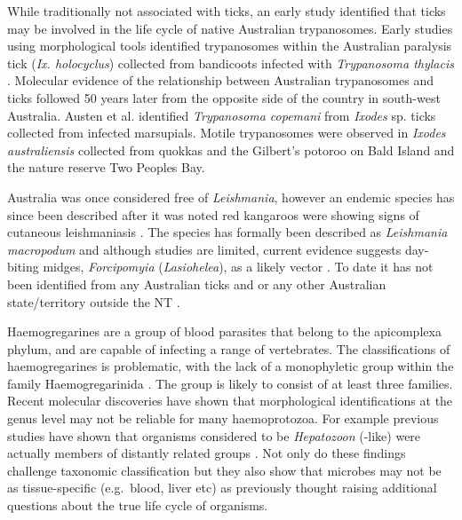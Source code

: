 \documentclass[a4paper, nobind]{templates/ociamthesis}
\begin{document}
While traditionally not associated with ticks, an early study identified that ticks may be involved in the life cycle of native Australian trypanosomes.
Early studies using morphological tools identified trypanosomes within the Australian paralysis tick (\emph{Ix. holocyclus}) collected from bandicoots infected with \emph{Trypanosoma thylacis} \autocite{mackerrasHaematozoaAustralianMammals1959}.
Molecular evidence of the relationship between Australian trypanosomes and ticks followed 50 years later from the opposite side of the country in south-west Australia.
Austen et al. \autocite*{austenVectorTrypanosomaCopemani2011} identified \emph{Trypanosoma copemani} from \emph{Ixodes} sp. ticks collected from infected marsupials.
Motile trypanosomes were observed in \emph{Ixodes australiensis} collected from quokkas and the Gilbert's potoroo on Bald Island and the nature reserve Two Peoples Bay.

Australia was once considered free of \emph{Leishmania}, however an endemic species has since been described after it was noted red kangaroos were showing signs of cutaneous leishmaniasis \autocite{roseCutaneousLeishmaniasisRed2004}.
The species has formally been described as \emph{Leishmania macropodum} \autocite{barrattIsolationNovelTrypanosomatid2017} and although studies are limited, current evidence suggests day-biting midges, \emph{Forcipomyia} (\emph{Lasiohelea}), as a likely vector \autocite{dougallEvidenceIncriminatingMidges2011,panahiUtilisingNovelSurveillance2020}.
To date it has not been identified from any Australian ticks and or any other Australian state/territory outside the NT \autocite{cleareRemainingVigilantExotic2014,dybingGhostsChristmasAbsence2016,thompsonExoticParasiteThreats2018}.

Haemogregarines are a group of blood parasites that belong to the apicomplexa phylum, and are capable of infecting a range of vertebrates.
The classifications of haemogregarines is problematic, with the lack of a monophyletic group within the family Haemogregarinida \autocite{al-quraishyHaemogregarinesCriteriaIdentification2021}. The group is likely to consist of at least three families.
Recent molecular discoveries have shown that morphological identifications at the genus level may not be reliable for many haemoprotozoa.
For example previous studies have shown that organisms considered to be \emph{Hepatozoon} (-like) were actually members of distantly related groups \autocite{merinoSarcocystidMisidentifiedHepatozoon2008,zhuLooksCanDeceive2009}.
Not only do these findings challenge taxonomic classification but they also show that microbes may not be as tissue-specific (e.g.~blood, liver etc) as previously thought raising additional questions about the true life cycle of organisms.
\end{document}

